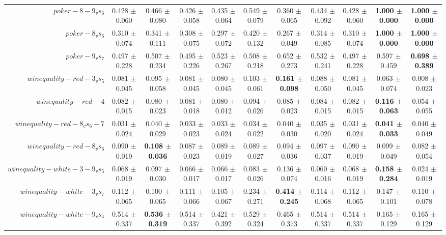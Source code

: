 \begin{table}[!ht]
{\begin{tabular}{r c c c c c c c c c c}
$poker-8-9_vs_6$ & 0.428 $\pm$ 0.060 & 0.466 $\pm$ 0.080 & 0.426 $\pm$ 0.058 & 0.435 $\pm$ 0.064 & 0.549 $\pm$ 0.079 & 0.360 $\pm$ 0.065 & 0.434 $\pm$ 0.092 & 0.428 $\pm$ 0.060 & \textbf{1.000 $\pm$ 0.000} & \textbf{1.000 $\pm$ 0.000} \\
$poker-8_vs_6$ & 0.310 $\pm$ 0.074 & 0.341 $\pm$ 0.111 & 0.308 $\pm$ 0.075 & 0.297 $\pm$ 0.072 & 0.420 $\pm$ 0.132 & 0.267 $\pm$ 0.049 & 0.314 $\pm$ 0.085 & 0.310 $\pm$ 0.074 & \textbf{1.000 $\pm$ 0.000} & \textbf{1.000 $\pm$ 0.000} \\
$poker-9_vs_7$ & 0.497 $\pm$ 0.228 & 0.507 $\pm$ 0.234 & 0.495 $\pm$ 0.226 & 0.523 $\pm$ 0.267 & 0.508 $\pm$ 0.218 & 0.652 $\pm$ 0.273 & 0.532 $\pm$ 0.241 & 0.497 $\pm$ 0.228 & 0.597 $\pm$ 0.459 & \textbf{0.698 $\pm$ 0.389} \\
$winequality-red-3_vs_5$ & 0.081 $\pm$ 0.045 & 0.095 $\pm$ 0.058 & 0.081 $\pm$ 0.045 & 0.080 $\pm$ 0.045 & 0.103 $\pm$ 0.061 & \textbf{0.161 $\pm$ 0.098} & 0.088 $\pm$ 0.050 & 0.081 $\pm$ 0.045 & 0.063 $\pm$ 0.074 & 0.008 $\pm$ 0.023 \\
$winequality-red-4$ & 0.082 $\pm$ 0.015 & 0.080 $\pm$ 0.023 & 0.081 $\pm$ 0.018 & 0.080 $\pm$ 0.012 & 0.094 $\pm$ 0.026 & 0.085 $\pm$ 0.023 & 0.084 $\pm$ 0.015 & 0.082 $\pm$ 0.015 & \textbf{0.116 $\pm$ 0.063} & 0.054 $\pm$ 0.055 \\
$winequality-red-8_vs_6-7$ & 0.031 $\pm$ 0.024 & 0.040 $\pm$ 0.029 & 0.033 $\pm$ 0.023 & 0.033 $\pm$ 0.024 & 0.034 $\pm$ 0.022 & 0.040 $\pm$ 0.030 & 0.035 $\pm$ 0.020 & 0.031 $\pm$ 0.024 & \textbf{0.041 $\pm$ 0.033} & 0.040 $\pm$ 0.049 \\
$winequality-red-8_vs_6$ & 0.090 $\pm$ 0.019 & \textbf{0.108 $\pm$ 0.036} & 0.087 $\pm$ 0.023 & 0.089 $\pm$ 0.019 & 0.089 $\pm$ 0.027 & 0.094 $\pm$ 0.036 & 0.097 $\pm$ 0.037 & 0.090 $\pm$ 0.019 & 0.099 $\pm$ 0.049 & 0.082 $\pm$ 0.054 \\
$winequality-white-3-9_vs_5$ & 0.068 $\pm$ 0.019 & 0.097 $\pm$ 0.030 & 0.066 $\pm$ 0.017 & 0.066 $\pm$ 0.017 & 0.083 $\pm$ 0.026 & 0.136 $\pm$ 0.074 & 0.060 $\pm$ 0.016 & 0.068 $\pm$ 0.019 & \textbf{0.158 $\pm$ 0.284} & 0.024 $\pm$ 0.019 \\
$winequality-white-3_vs_7$ & 0.112 $\pm$ 0.065 & 0.100 $\pm$ 0.065 & 0.111 $\pm$ 0.066 & 0.105 $\pm$ 0.067 & 0.234 $\pm$ 0.271 & \textbf{0.414 $\pm$ 0.245} & 0.114 $\pm$ 0.068 & 0.112 $\pm$ 0.065 & 0.147 $\pm$ 0.101 & 0.110 $\pm$ 0.078 \\
$winequality-white-9_vs_4$ & 0.514 $\pm$ 0.337 & \textbf{0.536 $\pm$ 0.319} & 0.514 $\pm$ 0.337 & 0.421 $\pm$ 0.392 & 0.529 $\pm$ 0.324 & 0.465 $\pm$ 0.373 & 0.514 $\pm$ 0.337 & 0.514 $\pm$ 0.337 & 0.165 $\pm$ 0.129 & 0.165 $\pm$ 0.129 \\

\end{tabular}}
\end{table}

